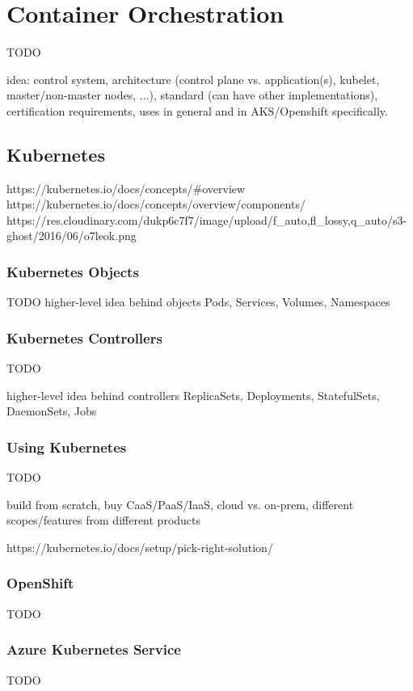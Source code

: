 \section{Container Orchestration}
TODO

idea: control system, architecture (control plane vs. application(s), kubelet, master/non-master nodes, ...), standard (can have other implementations), certification requirements, uses in general and in AKS/Openshift specifically.

\subsection{Kubernetes}

https://kubernetes.io/docs/concepts/\#overview \\
https://kubernetes.io/docs/concepts/overview/components/ \\
https://res.cloudinary.com/dukp6c7f7/image/upload/f\_auto,fl\_lossy,q\_auto/s3-ghost/2016/06/o7leok.png \\

\subsubsection{Kubernetes Objects}
TODO
higher-level idea behind objects
Pods, Services, Volumes, Namespaces

\subsubsection{Kubernetes Controllers}
TODO

higher-level idea behind controllers
ReplicaSets, Deployments, StatefulSets, DaemonSets, Jobs

\subsubsection{Using Kubernetes}
TODO

build from scratch, buy CaaS/PaaS/IaaS, cloud vs. on-prem, different scopes/features from different products

https://kubernetes.io/docs/setup/pick-right-solution/

\subsubsection{OpenShift}
TODO

\subsubsection{Azure Kubernetes Service}
TODO

